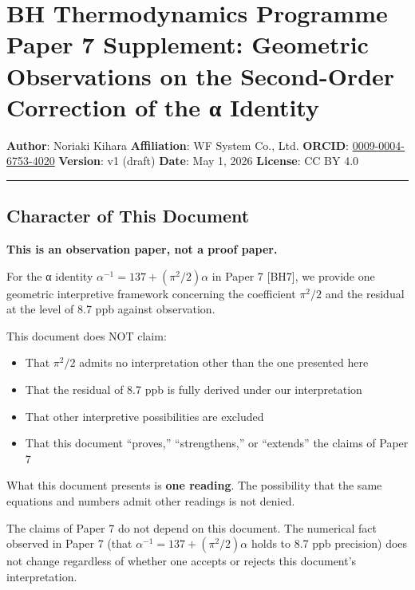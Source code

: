 \documentclass[
]{article}
\author{}
\date{}
\providecommand{\tightlist}{%
  \setlength{\itemsep}{0pt}\setlength{\parskip}{0pt}}
\begin{document}
\section{BH Thermodynamics Programme Paper 7 Supplement: Geometric
Observations on the Second-Order Correction of the α
Identity}\label{bh-thermodynamics-programme-paper-7-supplement-geometric-observations-on-the-second-order-correction-of-the-ux3b1-identity}

\textbf{Author}: Noriaki Kihara \textbf{Affiliation}: WF System Co.,
Ltd. \textbf{ORCID}:
\href{https://orcid.org/0009-0004-6753-4020}{0009-0004-6753-4020}
\textbf{Version}: v1 (draft) \textbf{Date}: May 1, 2026
\textbf{License}: CC BY 4.0

\begin{center}\rule{0.5\linewidth}{0.5pt}\end{center}

\subsection{Character of This
Document}\label{character-of-this-document}

\textbf{This is an observation paper, not a proof paper.}

For the α identity \(\alpha^{-1} = 137 + (\pi^2/2)\alpha\) in Paper 7
{[}BH7{]}, we provide one geometric interpretive framework concerning
the coefficient \(\pi^2/2\) and the residual at the level of 8.7 ppb
against observation.

This document does NOT claim:

\begin{itemize}
\tightlist
\item
  That \(\pi^2/2\) admits no interpretation other than the one presented
  here
\item
  That the residual of 8.7 ppb is fully derived under our interpretation
\item
  That other interpretive possibilities are excluded
\item
  That this document ``proves,'' ``strengthens,'' or ``extends'' the
  claims of Paper 7
\end{itemize}

What this document presents is \textbf{one reading}. The possibility
that the same equations and numbers admit other readings is not denied.

The claims of Paper 7 do not depend on this document. The numerical fact
observed in Paper 7 (that \(\alpha^{-1} = 137 + (\pi^2/2)\alpha\) holds
to 8.7 ppb precision) does not change regardless of whether one accepts
or rejects this document's interpretation.
\end{document}
